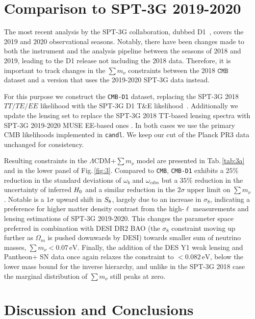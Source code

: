 \documentclass[12pt,a4paper]{article}
\newcommand{\eV}{\,\text{eV}}
\newcommand\?{/\hspace{0pt}}
\def\Mnu{\sum m_\nu}
\begin{document}
\section{Comparison to SPT-3G 2019-2020}

The most recent analysis by the SPT-3G collaboration, dubbed D1~\cite{SPT-3G:2025bzu}, covers the 2019 and 2020 observational seasons. Notably, there have been changes made to both the instrument and the analysis pipeline between the seasons of 2018 and 2019, leading to the D1 release not including the 2018 data. Therefore, it is important to track changes in the $\Mnu$ constraints between the 2018 $\texttt{CMB}$ dataset and a version that uses the 2019-2020 SPT-3G data instead. 

For this purpose we construct the \texttt{CMB-D1} dataset, replacing the SPT-3G 2018 $TT/TE/EE$ likelihood with the SPT-3G D1 T$\&$E likelihood~\cite{SPT-3G:2025bzu}. Additionally we update the lensing set to replace the SPT-3G 2018 TT-based lensing spectra with SPT-3G 2019-2020 MUSE EE-based ones \cite{SPT-3G:2024atg}. In both cases we use the primary CMB likelihoods implemented in \texttt{candl}. We keep our cut of the Planck PR3 data unchanged for consistency.

Resulting constraints in the $\Lambda$CDM+$\Mnu$ model are presented in Tab.\,\ref{tab:3a} and in the lower panel of Fig.\,\ref{fig:3}. Compared to \texttt{CMB}, \texttt{CMB-D1} exhibits a $25\%$ reduction in the standard deviations of $\omega_b$ and $\omega_{cdm}$ but a $35\%$ reduction in the uncertainty  of inferred $H_{\rm 0}$ and a similar reduction in the $2\sigma$ upper limit on $\Mnu$. Notable is a $1\sigma$ upward shift in $S_{\rm 8}$, largely due to an increase in $\sigma_8$, indicating a preference for higher matter density contrast from the high-$\ell$ measurements and lensing estimations of SPT-3G 2019-2020. This changes the parameter space preferred in combination with DESI DR2 BAO (the $\sigma_8$ constraint moving up further as $\Omega_m$ is pushed downwards by DESI) towards smaller sum of neutrino masses, $\Mnu<0.07\eV$.
Finally, the addition of the DES Y1 weak lensing and Pantheon+ SN data once again relaxes the constraint to $<0.082\eV$, below the lower mass bound for the inverse hierarchy, and unlike in the SPT-3G 2018 case the marginal distribution of $\Mnu$ still peaks at zero.

\section{Discussion and Conclusions}
\end{document}
